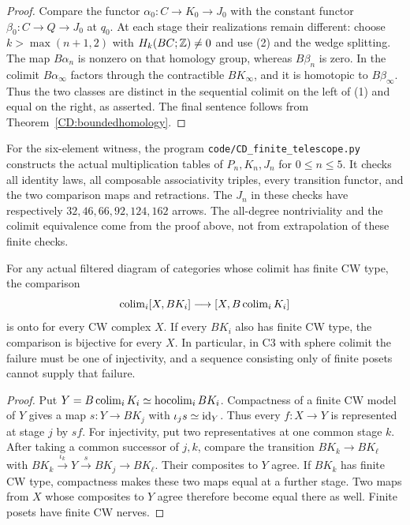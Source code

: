 \begin{proof}
Compare the functor $\alpha_0:C\to K_0\to J_0$ with the constant
functor $\beta_0:C\to Q\to J_0$ at $q_0$.
At each stage their realizations remain different: choose
$k>\max(n+1,2)$ with $H_k(BC;\mathbb Z)\ne0$ and use (2) and the wedge
splitting.  The map $B\alpha_n$ is nonzero on that homology group,
whereas $B\beta_n$ is zero.
In the colimit $B\alpha_\infty$ factors through the contractible
$BK_\infty$, and it is homotopic to $B\beta_\infty$.
Thus the two classes are distinct in the sequential colimit on the
left of (1) and equal on the right, as asserted.
The final sentence follows from Theorem~\ref{CD:boundedhomology}.
\end{proof}

For the six-element witness, the program
\texttt{code/CD\_finite\_telescope.py} constructs the actual multiplication
tables of $P_n,K_n,J_n$ for $0\le n\le5$.  It checks all identity laws,
all composable associativity triples, every transition functor, and
the two comparison maps and retractions.  The $J_n$ in these checks
have respectively $32,46,66,92,124,162$ arrows.  The all-degree
nontriviality and the colimit equivalence come from the proof above,
not from extrapolation of these finite checks.

\begin{proposition}
\label{CD:surjectivity}
For any actual filtered diagram of categories whose colimit has finite
CW type, the comparison
\[
             \operatorname{colim}_i[X,BK_i]\longrightarrow[X,B\operatorname{colim}_iK_i]
\]
is onto for every CW complex $X$.  If every $BK_i$ also has finite
CW type, the comparison is bijective for every $X$.
In particular, in C3 with sphere colimit the failure must be one of
injectivity, and a sequence consisting only of finite posets cannot
supply that failure.
\end{proposition}
\begin{proof}
Put $Y=B\operatorname{colim}_iK_i\simeq\operatorname{hocolim}_iBK_i$.
Compactness of a finite CW model of $Y$ gives a map
$s:Y\to BK_j$ with $\iota_js\simeq\mathrm{id}_Y$.
Thus every $f:X\to Y$ is represented at stage $j$ by $sf$.
For injectivity, put two representatives at one common stage $k$.
After taking a common successor of $j,k$, compare the transition
$BK_k\to BK_\ell$ with $BK_k\xrightarrow{\iota_k}Y
\xrightarrow{s}BK_j\to BK_\ell$.
Their composites to $Y$ agree.  If $BK_k$ has finite CW type,
compactness makes these two maps equal at a further stage.
Two maps from $X$ whose composites to $Y$ agree therefore become
equal there as well.  Finite posets have finite CW nerves.
\end{proof}

